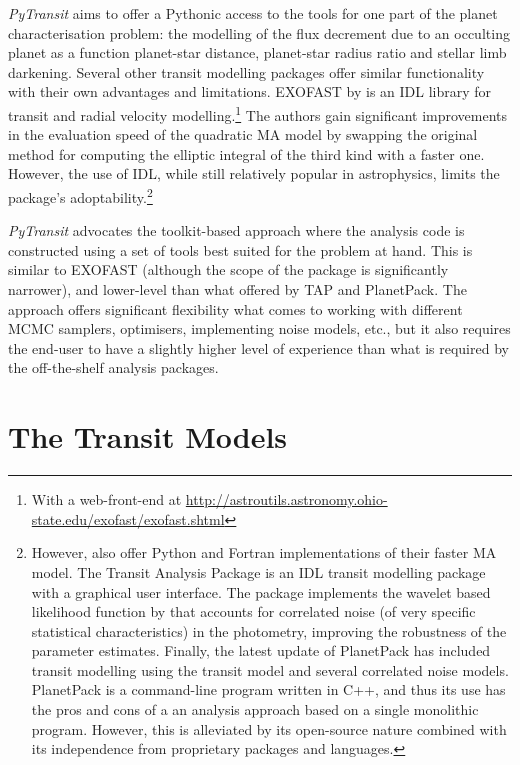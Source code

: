 \documentclass[usenatbib,usegraphicx,useAMS]{mn2e}
\newcommand{\pytransit}{\textit{PyTransit}\xspace}
\begin{document}
{\pytransit aims to offer a Pythonic access to the tools for one part of the planet characterisation problem: 
the modelling of the flux decrement due to an occulting planet as a function planet-star distance, planet-star radius 
ratio and stellar limb darkening. 
%
Several other transit modelling packages offer similar functionality with their own advantages and limitations. 
EXOFAST by \citet{Eastman2013} is an IDL library for transit and radial velocity modelling.\footnote{With a 
web-front-end at \url{http://astroutils.astronomy.ohio-state.edu/exofast/exofast.shtml}} The authors gain significant 
improvements in the evaluation speed of the quadratic MA model by swapping the original method for computing the 
elliptic integral of the third kind with a faster one. However, the use of IDL, while still relatively popular in 
astrophysics, limits the package's adoptability.\footnote{However, \citeauthor{Eastman2013} also offer Python and 
Fortran implementations of their faster MA model.
%
The Transit Analysis Package \citep[TAP,][]{Gazak2011} is an IDL transit modelling package with a graphical user 
interface. The package implements the wavelet based likelihood function by \citet{Carter2009} that accounts for 
correlated noise (of very specific statistical characteristics) in the photometry, improving the robustness of the 
parameter estimates.
%
Finally, the latest update of PlanetPack \citep{Baluev2014} has included transit modelling using the 
\citeauthor{Abubekerov2013} transit model and several correlated noise models. PlanetPack is a command-line program 
written in C++, and thus its use has the pros and cons of a an analysis approach based on a single monolithic program. 
However, this is alleviated by its open-source nature combined with its independence from proprietary packages and 
languages.
}

\pytransit advocates the toolkit-based approach where the analysis code is constructed using a set of tools best suited 
for the problem at hand. This is similar to EXOFAST (although the scope of the package is significantly narrower), and 
lower-level than what offered by TAP and PlanetPack. The approach offers significant flexibility what comes to working 
with different MCMC samplers, optimisers, implementing noise models, etc., but it also requires the end-user to have a 
slightly higher level of experience than what is required by the off-the-shelf analysis packages.

\section{The Transit Models}
\label{sec:transit_models}
}
\end{document}
